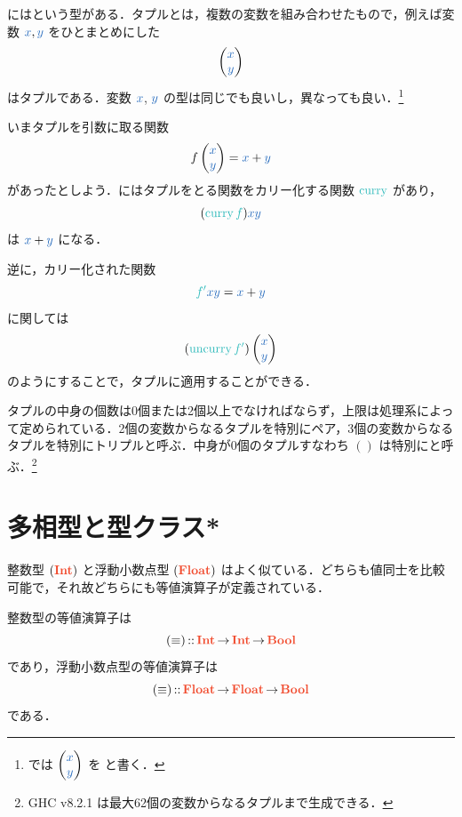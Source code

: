 \documentclass[a5paper,twoside,fleqn,draft]{jsbook}
\begin{document}
\separator

\haskell にはという型がある．タプルとは，複数の変数を組み合わせたもので，例えば変数 $\hVar{x},\hVar{y}$ をひとまとめにした
\begin{equation}
  \mPairWith{\hVar{x}}{\hVar{y}}
\end{equation}
はタプルである．変数 $\hVar{x}$, $\hVar{y}$ の型は同じでも良いし，異なっても良い．\footnote{\haskell では $\mPairWith{\hVar{x}}{\hVar{y}}$ を  と書く．}

いまタプルを引数に取る関数
\begin{equation}
  f\mPairWith{\hVar{x}}{\hVar{y}}
  =\hVar{x}+\hVar{y}
\end{equation}
があったとしよう．\haskell にはタプルをとる関数をカリー化する関数 $\mCurry$ があり，
\begin{equation}
  (\mCurry\hFunc{f})\hVar{x}\hVar{y}
\end{equation}
は $\hVar{x}+\hVar{y}$ になる．

逆に，カリー化された関数
\begin{equation}
  \hFunc{f'}\hVar{x}\hVar{y}
  =\hVar{x}+\hVar{y}
\end{equation}
に関しては
\begin{equation}
  (\mUncurry\hFunc{f'})\mPairWith{\hVar{x}}{\hVar{y}}
\end{equation}
のようにすることで，タプルに適用することができる．

\separator

タプルの中身の個数は0個または2個以上でなければならず，上限は処理系によって定められている．2個の変数からなるタプルを特別にペア，3個の変数からなるタプルを特別にトリプルと呼ぶ．中身が0個のタプルすなわち $()$ は特別にと呼ぶ．\footnote{GHC v8.2.1 は最大62個の変数からなるタプルまで生成できる．}

\section{多相型と型クラス*}

整数型 $(\mIntType)$ と浮動小数点型 $(\mFloatType)$ はよく似ている．どちらも値同士を比較可能で，それ故どちらにも等値演算子が定義されている．

整数型の等値演算子は
\begin{equation}
  (\hIfEq)
  \mIn\mIntType\mFuncArrow\mIntType\mFuncArrow\mBoolType
\end{equation}
であり，浮動小数点型の等値演算子は
\begin{equation}
  (\hIfEq)
  \mIn\mFloatType\mFuncArrow\mFloatType\mFuncArrow\mBoolType
\end{equation}
である．
\end{document}
